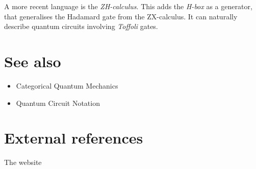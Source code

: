 \documentclass[a4paper, 12pt]{article}
\begin{document}
A more recent language is the \emph{ZH-calculus}. This adds the \emph{H-box} as a generator, that generalises the Hadamard gate from the ZX-calculus. It can naturally describe quantum circuits involving \emph{Toffoli} gates.


\section{See also}
\begin{itemize}
  \item Categorical Quantum Mechanics
  \item Quantum Circuit Notation
\end{itemize}



\section{External references}
The website
\end{document}
